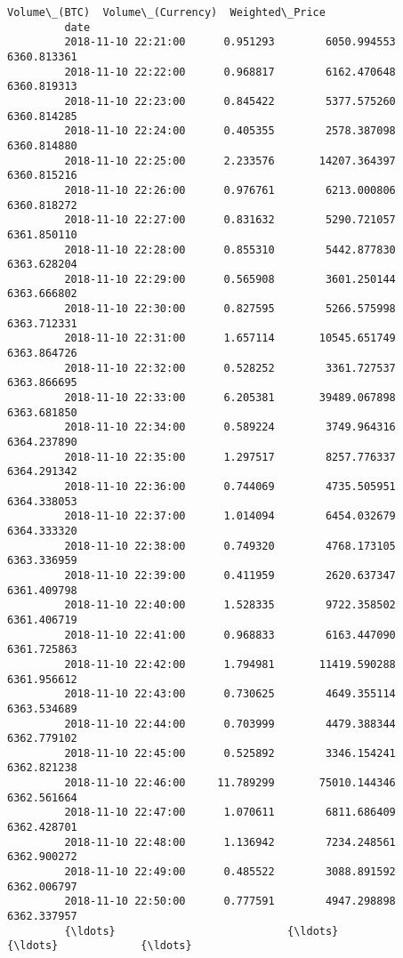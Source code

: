 \documentclass[11pt]{article}
\begin{document}
\begin{Verbatim}[commandchars=\\\{\}]
                              Volume\_(BTC)  Volume\_(Currency)  Weighted\_Price  
         date                                                                  
         2018-11-10 22:21:00      0.951293        6050.994553     6360.813361  
         2018-11-10 22:22:00      0.968817        6162.470648     6360.819313  
         2018-11-10 22:23:00      0.845422        5377.575260     6360.814285  
         2018-11-10 22:24:00      0.405355        2578.387098     6360.814880  
         2018-11-10 22:25:00      2.233576       14207.364397     6360.815216  
         2018-11-10 22:26:00      0.976761        6213.000806     6360.818272  
         2018-11-10 22:27:00      0.831632        5290.721057     6361.850110  
         2018-11-10 22:28:00      0.855310        5442.877830     6363.628204  
         2018-11-10 22:29:00      0.565908        3601.250144     6363.666802  
         2018-11-10 22:30:00      0.827595        5266.575998     6363.712331  
         2018-11-10 22:31:00      1.657114       10545.651749     6363.864726  
         2018-11-10 22:32:00      0.528252        3361.727537     6363.866695  
         2018-11-10 22:33:00      6.205381       39489.067898     6363.681850  
         2018-11-10 22:34:00      0.589224        3749.964316     6364.237890  
         2018-11-10 22:35:00      1.297517        8257.776337     6364.291342  
         2018-11-10 22:36:00      0.744069        4735.505951     6364.338053  
         2018-11-10 22:37:00      1.014094        6454.032679     6364.333320  
         2018-11-10 22:38:00      0.749320        4768.173105     6363.336959  
         2018-11-10 22:39:00      0.411959        2620.637347     6361.409798  
         2018-11-10 22:40:00      1.528335        9722.358502     6361.406719  
         2018-11-10 22:41:00      0.968833        6163.447090     6361.725863  
         2018-11-10 22:42:00      1.794981       11419.590288     6361.956612  
         2018-11-10 22:43:00      0.730625        4649.355114     6363.534689  
         2018-11-10 22:44:00      0.703999        4479.388344     6362.779102  
         2018-11-10 22:45:00      0.525892        3346.154241     6362.821238  
         2018-11-10 22:46:00     11.789299       75010.144346     6362.561664  
         2018-11-10 22:47:00      1.070611        6811.686409     6362.428701  
         2018-11-10 22:48:00      1.136942        7234.248561     6362.900272  
         2018-11-10 22:49:00      0.485522        3088.891592     6362.006797  
         2018-11-10 22:50:00      0.777591        4947.298898     6362.337957  
         {\ldots}                           {\ldots}                {\ldots}             {\ldots}  

\end{Verbatim}
\end{document}
